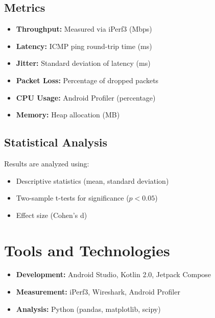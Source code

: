 \subsection{Metrics}

\begin{itemize}
    \item \textbf{Throughput:} Measured via iPerf3 (Mbps)
    \item \textbf{Latency:} ICMP ping round-trip time (ms)
    \item \textbf{Jitter:} Standard deviation of latency (ms)
    \item \textbf{Packet Loss:} Percentage of dropped packets
    \item \textbf{CPU Usage:} Android Profiler (percentage)
    \item \textbf{Memory:} Heap allocation (MB)
\end{itemize}

\subsection{Statistical Analysis}

Results are analyzed using:
\begin{itemize}
    \item Descriptive statistics (mean, standard deviation)
    \item Two-sample t-tests for significance ($p < 0.05$)
    \item Effect size (Cohen's d)
\end{itemize}

\section{Tools and Technologies}

\begin{itemize}
    \item \textbf{Development:} Android Studio, Kotlin 2.0, Jetpack Compose
    \item \textbf{Measurement:} iPerf3, Wireshark, Android Profiler
    \item \textbf{Analysis:} Python (pandas, matplotlib, scipy)
\end{itemize}
